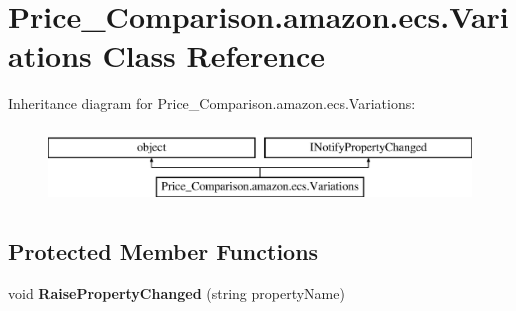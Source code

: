 \hypertarget{class_price___comparison_1_1amazon_1_1ecs_1_1_variations}{\section{Price\-\_\-\-Comparison.\-amazon.\-ecs.\-Variations Class Reference}
\label{class_price___comparison_1_1amazon_1_1ecs_1_1_variations}
}


 


Inheritance diagram for Price\-\_\-\-Comparison.\-amazon.\-ecs.\-Variations\-:\begin{figure}[H]
\begin{center}
\leavevmode
\includegraphics[height=2.000000cm]{class_price___comparison_1_1amazon_1_1ecs_1_1_variations}
\end{center}
\end{figure}
\subsection*{Protected Member Functions}
\begin{DoxyCompactItemize}
\item 
\hypertarget{class_price___comparison_1_1amazon_1_1ecs_1_1_variations_a2652bad045758c156a625a44d33e9a73}{void {\bfseries Raise\-Property\-Changed} (string property\-Name)}\label{class_price___comparison_1_1amazon_1_1ecs_1_1_variations_a2652bad045758c156a625a44d33e9a73}

\end{DoxyCompactItemize}
